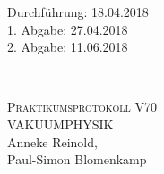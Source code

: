 



\begin{titlepage}
  \begin{flushleft}
 Durchführung: 18.04.2018\\
 1. Abgabe: 27.04.2018\\
 2. Abgabe: 11.06.2018
  \end{flushleft}


\HRule\\[1,0cm]

 \begin{center}


\textsc{\LARGE Praktikumsprotokoll V70}\\[1.5cm]
\textsc{\huge VAKUUMPHYSIK} \\[5,5cm]

Anneke Reinold\footnotemark[1], \\
Paul-Simon Blomenkamp\footnotemark[2] \\[1,0cm]



 \end{center}
\HRule

 \vfill

\end{titlepage}






\printbibliography


